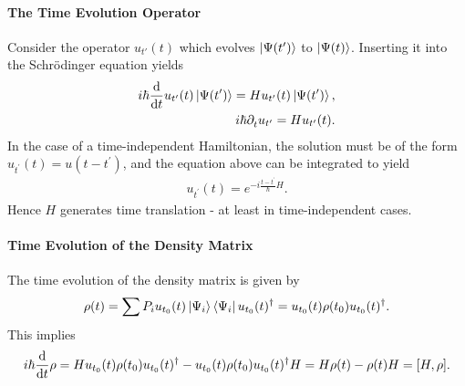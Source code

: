\paragraph{The Time Evolution Operator}
Consider the operator $u_{t'}(t)$ which evolves $\ket{\Psi(t')}$ to $\ket{\Psi(t)}$. Inserting it into the Schrödinger equation yields
\begin{align*}
	i\hbar\dv{t}u_{t^{\prime}}(t)\ket{\Psi(t^{\prime})} = Hu_{t^{\prime}}(t)\ket{\Psi(t^{\prime})}, \\
	i\hbar\partial_{t}^{}u_{t^{\prime}} = Hu_{t^{\prime}}(t).
\end{align*}
In the case of a time-independent Hamiltonian, the solution must be of the form $u_{t^{\prime}}(t) = u(t - t^{\prime})$, and the equation above can be integrated to yield
\begin{align*}
	u_{t^{\prime}}(t) = e^{-i\frac{t - t^{\prime}}{\hbar}H}.
\end{align*}
Hence $H$ generates time translation - at least in time-independent cases.

\paragraph{Time Evolution of the Density Matrix}
The time evolution of the density matrix is given by
\begin{align*}
	\rho(t) = \sum P_{i}u_{t_{0}}(t)\ket{\Psi_{i}}\bra{\Psi_{i}}u_{t_{0}}(t)^{\dagger} = u_{t_{0}}(t)\rho(t_{0})u_{t_{0}}(t)^{\dagger}.
\end{align*}
This implies
\begin{align*}
	i\hbar\dv{t}\rho = Hu_{t_{0}}(t)\rho(t_{0})\adj{u_{t_{0}}(t)} - u_{t_{0}}(t)\rho(t_{0})\adj{u_{t_{0}}(t)}H = H\rho(t) - \rho(t)H = \comm{H}{\rho}.
\end{align*}


